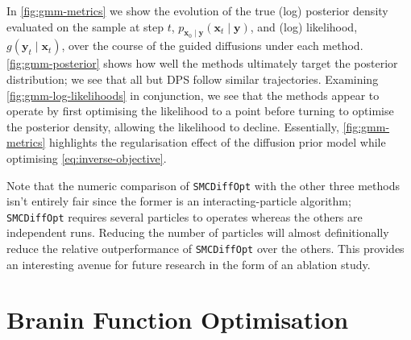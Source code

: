 In \autoref{fig:gmm-metrics} we show the evolution of the true (log) posterior density evaluated on the
sample at step $t$, $p_{\mathbf{x}_0 \mid \mathbf{y}}(\mathbf{x}_t \mid \mathbf{y})$, and (log)
likelihood, $g(\mathbf{y}_t \mid \mathbf{x}_t)$, over the course of the guided diffusions under
each method. \autoref{fig:gmm-posterior} shows how well the methods ultimately target the posterior
distribution; we see that all but DPS follow similar trajectories.
Examining \autoref{fig:gmm-log-likelihoods} in conjunction, we see that the methods appear to operate
by first optimising the likelihood to a point before turning to optimise the posterior density,
allowing the likelihood to decline. Essentially, \autoref{fig:gmm-metrics} highlights the regularisation
effect of the diffusion prior model while optimising \autoref{eq:inverse-objective}.

Note that the numeric comparison of \texttt{SMCDiffOpt} with the other three methods isn't entirely
fair since the former is an interacting-particle algorithm; \texttt{SMCDiffOpt} requires several
particles to operates whereas the others are independent runs. Reducing the number of particles
will almost definitionally reduce the relative outperformance of \texttt{SMCDiffOpt} over the
others. This provides an interesting avenue for future research in the form of an ablation study.

\section{Branin Function Optimisation} \label{sec:branin}

